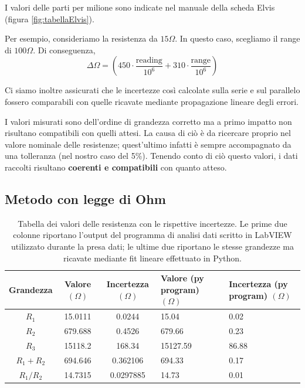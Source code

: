 \documentclass[11pt]{article}
\begin{document}
I valori delle parti per milione sono indicate nel manuale della scheda Elvis (figura \ref{fig:tabellaElvis}). 

Per esempio, consideriamo la resistenza da $15 \Omega$. In questo caso, scegliamo il range di $100 \Omega$. Di conseguenza, 
\begin{equation*}
    \Delta\Omega = \left(450\cdot\frac{\text{reading}}{10^6} +310\cdot\frac{\text{range}}{10^6}\right)
\end{equation*}

Ci siamo inoltre assicurati che le incertezze così calcolate sulla serie e sul parallelo fossero comparabili con quelle ricavate mediante propagazione lineare degli errori.

I valori misurati sono dell'ordine di grandezza corretto ma a primo impatto non risultano compatibili con quelli attesi. 
La causa di ciò è da ricercare proprio nel valore nominale delle resistenze; quest'ultimo infatti è sempre accompagnato da una tolleranza (nel nostro caso del 5\%).
Tenendo conto di ciò questo valori, i dati raccolti risultano \textbf{coerenti e compatibili} con quanto atteso.


\subsection{Metodo con legge di Ohm}

\begin{table}[H]
\centering
\begin{tabularx}{\textwidth}{|c|c|c|X|X|}
\hline
\textbf{Grandezza} &
\textbf{Valore $(\Omega)$} &
\textbf{Incertezza $(\Omega)$} &
\textbf{Valore (py program) $(\Omega)$} &
\textbf{Incertezza (py program) $(\Omega)$} \\
\hline
$R_1$ & 15.0111 & 0.0244 & 15.04 & 0.02 \\ \hline
$R_2$ & 679.688 & 0.4526 & 679.66 & 0.23 \\ \hline
$R_3$ & 15118.2 & 168.34 & 15127.59 & 86.88 \\ \hline
$R_1 + R_2$ & 694.646 & 0.362106 & 694.33 & 0.17 \\ \hline
$R_1 / R_2$ & 14.7315 & 0.0297885 & 14.73 & 0.01 \\ \hline
\end{tabularx}
\caption{Tabella dei valori delle resistenza con le rispettive incertezze. Le prime due colonne riportano l'output del programma di analisi dati scritto in LabVIEW utilizzato durante la presa dati; le ultime due riportano le stesse grandezze ma ricavate mediante fit lineare effettuato in Python.}
\label{tab:resistenzeOhm}
\end{table}
\end{document}
